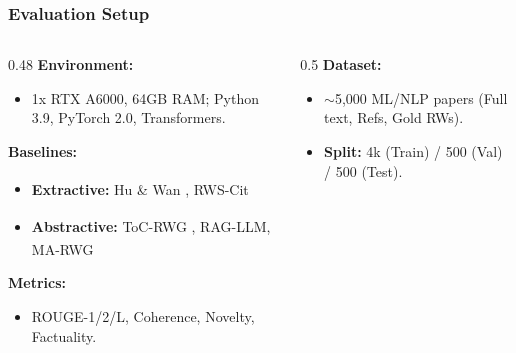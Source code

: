\begin{frame}[t] %
\vspace{-1cm}
\frametitle{Evaluation Setup}
\scriptsize %

\begin{columns}[t] 

    \begin{column}{0.48\textwidth}
        \textbf{Environment:}
        \begin{itemize}[\itemsep=-2pt] %
            \item 1x RTX A6000, 64GB RAM; Python 3.9, PyTorch 2.0, Transformers.
        \end{itemize}
        \vspace{0.2cm}

        \textbf{Baselines:}
        \begin{itemize}[\itemsep=-2pt]
            \item \textbf{Extractive:} Hu \& Wan \textsuperscript{\cite{hu2014automatic}}, RWS-Cit \textsuperscript{\cite{chen2019automatic}}
            \item \textbf{Abstractive:} ToC-RWG \textsuperscript{\cite{wang2019tocrwg}}, RAG-LLM, MA-RWG \textsuperscript{\cite{liu2025select}}
        \end{itemize}
        \vspace{0.2cm}

        \textbf{Metrics:}
        \begin{itemize}[\itemsep=-2pt]
            \item ROUGE-1/2/L, Coherence, Novelty, Factuality.
        \end{itemize}
        
    \end{column}

    \begin{column}{0.5\textwidth}
        \textbf{Dataset:}
        \begin{itemize}[\itemsep=-2pt]
            \item $\sim$5,000 ML/NLP papers (Full text, Refs, Gold RWs).
            \item \textbf{Split:} 4k (Train) / 500 (Val) / 500 (Test).
        \end{itemize}
        \vspace{0.3cm}


\end{column}
\end{columns}
\end{frame}
